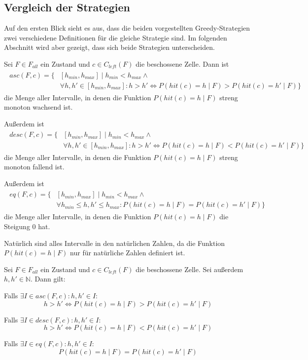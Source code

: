 \documentclass[a4paper,12pt]{llncs}
\numberwithin{equation}{section}
\begin{document}
\subsection{Vergleich der Strategien}
Auf den ersten Blick sieht es aus, dass die beiden vorgestellten Greedy-Strategien zwei verschiedene Definitionen für die gleiche Strategie sind. Im folgenden Abschnitt wird aber gezeigt, dass sich beide Strategien unterscheiden.

\begin{definition}
Sei $F\in F_{all}$ ein Zustand und $c \in C_{left}(F)$ die beschossene Zelle.
Dann ist
\begin{align}
\begin{split}
asc(F, c)=\{&[h_{min}, h_{max}] \mid h_{min} < h_{max} \wedge \\ 
&\forall h,h' \in [h_{min}, h_{max}]  \colon h > h' \Leftrightarrow P(hit(c)=h \mid F) > P(hit(c)=h' \mid F)\}
\nonumber
\end{split}
\end{align}
die Menge aller Intervalle, in denen die Funktion $P(hit(c)=h \mid F)$ streng monoton wachsend ist.

Außerdem ist
\begin{align}
\begin{split}
desc(F, c)=\{&[h_{min}, h_{max}] \mid h_{min} < h_{max} \wedge \\ 
&\forall h,h' \in [h_{min}, h_{max}]  \colon h > h' \Leftrightarrow P(hit(c)=h \mid F) < P(hit(c)=h' \mid F)\}
\nonumber
\end{split}
\end{align}
die Menge aller Intervalle, in denen die Funktion $P(hit(c)=h \mid F)$ streng monoton fallend ist.

Außerdem ist
\begin{align}
\begin{split}
eq(F, c)=\{&[h_{min}, h_{max}] \mid h_{min} < h_{max} \wedge \\ 
&\forall h_{min} \leq h,h' \leq h_{max} \colon P(hit(c)=h \mid F) = P(hit(c)=h' \mid F)\}
\nonumber
\end{split}
\end{align}
die Menge aller Intervalle, in denen die Funktion $P(hit(c)=h \mid F)$ die Steigung 0 hat.

Natürlich sind alles Intervalle in den natürlichen Zahlen, da die Funktion $P(hit(c)=h \mid F)$ nur für natürliche Zahlen definiert ist.
\end{definition}

\begin{lemma}
Sei $F\in F_{all}$ ein Zustand und $c \in C_{left}(F)$ die beschossene Zelle.
Sei außerdem $h,h' \in \mathbb{N}$.
Dann gilt:

Falls $\exists I \in asc(F, c) \colon h,h' \in I$:
\[
h > h' \Leftrightarrow P(hit(c)=h \mid F) > P(hit(c)=h' \mid F)
\]

Falls $\exists I \in desc(F, c) \colon h,h' \in I$:
\[
h > h' \Leftrightarrow P(hit(c)=h \mid F) < P(hit(c)=h' \mid F)
\]

Falls $\exists I \in eq(F, c) \colon h,h' \in I$:
\[
P(hit(c)=h \mid F) = P(hit(c)=h' \mid F)
\]

\end{lemma}
\end{document}
